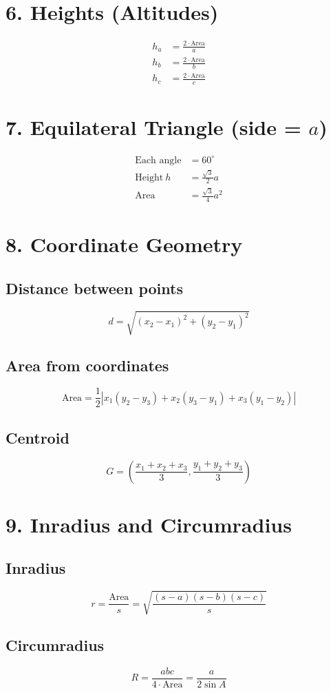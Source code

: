 \section*{6. Heights (Altitudes)}
\begin{align*}
h_a &= \frac{2 \cdot \text{Area}}{a} \\
h_b &= \frac{2 \cdot \text{Area}}{b} \\
h_c &= \frac{2 \cdot \text{Area}}{c}
\end{align*}

\section*{7. Equilateral Triangle (side = \(a\))}
\begin{align*}
\text{Each angle} &= 60^\circ \\
\text{Height} \ h &= \frac{\sqrt{3}}{2} a \\
\text{Area} &= \frac{\sqrt{3}}{4} a^2
\end{align*}

\section*{8. Coordinate Geometry}
\subsection*{Distance between points}
\[
d = \sqrt{(x_2 - x_1)^2 + (y_2 - y_1)^2}
\]

\subsection*{Area from coordinates}
\[
\text{Area} = \frac{1}{2} \left| x_1(y_2 - y_3) + x_2(y_3 - y_1) + x_3(y_1 - y_2) \right|
\]

\subsection*{Centroid}
\[
G = \left( \frac{x_1 + x_2 + x_3}{3}, \frac{y_1 + y_2 + y_3}{3} \right)
\]

\section*{9. Inradius and Circumradius}
\subsection*{Inradius}
\[
r = \frac{\text{Area}}{s} = \sqrt{\frac{(s-a)(s-b)(s-c)}{s}}
\]

\subsection*{Circumradius}
\[
R = \frac{abc}{4 \cdot \text{Area}} = \frac{a}{2 \sin A}
\]
